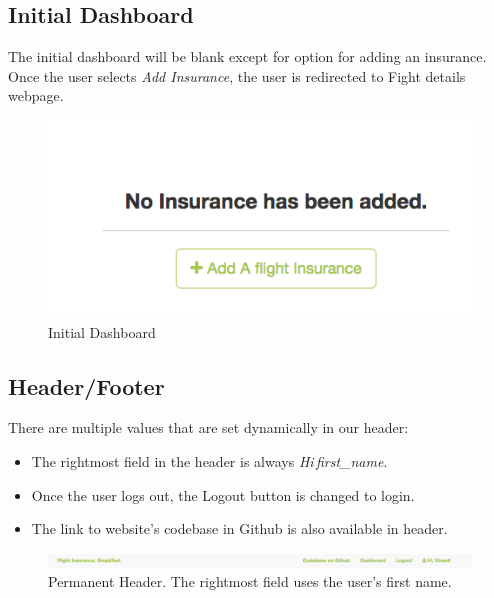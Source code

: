 \subsection{Initial Dashboard}
The initial dashboard will be blank except for option for adding an insurance.
Once the user selects \textit{Add Insurance}, the user is redirected to Fight details webpage.
\begin{figure}[h]
    \centering
    \includegraphics[width=\textwidth]{Figures/init_dashboard.png}
    \caption{Initial Dashboard}
    \label{fig:init_dash}
\end{figure}


\subsection{Header/Footer}
There are multiple values that are set dynamically in our header:
\begin{itemize}
    \item The rightmost field in the header is always \textit{Hi\,first\_name}.
    \item Once the user logs out, the Logout button is changed to login.
    \item The link to website's codebase in Github is also available in header.
\end{itemize}

\begin{figure}[h]
    \centering
    \includegraphics[width=\textwidth]{Figures/header.png}
    \caption{Permanent Header. The rightmost field uses the user's first name.}
    \label{fig:header}
\end{figure}

